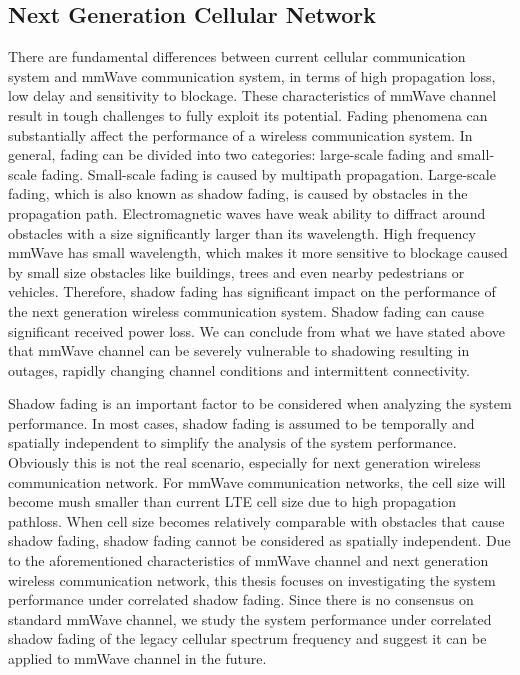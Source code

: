 \subsection{Next Generation Cellular Network}
\par There are fundamental differences between current cellular communication system and mmWave communication system, in terms of high propagation loss, low delay and sensitivity to blockage. These characteristics of mmWave channel result in tough challenges to fully exploit its potential. Fading phenomena can substantially affect the performance of a wireless communication system. In general, fading can be divided into two categories: large-scale fading and small-scale fading. Small-scale fading is caused by multipath propagation. Large-scale fading, which is also known as shadow fading, is caused by obstacles in the propagation path. Electromagnetic waves have weak ability to diffract around obstacles with a size significantly larger than its wavelength. High frequency mmWave has small wavelength, which makes it more sensitive to blockage caused by small size obstacles like buildings, trees and even nearby pedestrians or vehicles. Therefore, shadow fading has significant impact on the performance of the next generation wireless communication system. Shadow fading can cause significant received power loss. We can conclude from what we have stated above that mmWave channel can be severely vulnerable to shadowing resulting in outages, rapidly changing channel conditions and intermittent connectivity. 
\par Shadow fading is an important factor to be considered when analyzing the system performance. In most cases, shadow fading is assumed to be temporally and spatially independent to simplify the analysis of the system performance. Obviously this is not the real scenario, especially for next generation wireless communication network. For mmWave communication networks, the cell size will become mush smaller than current LTE cell size due to high propagation pathloss. When cell size becomes relatively comparable with obstacles that cause shadow fading, shadow fading cannot be considered as spatially independent. Due to the aforementioned characteristics of mmWave channel and next generation wireless communication network, this thesis focuses on investigating the system performance under correlated shadow fading. Since there is no consensus on standard mmWave channel, we study the system performance under correlated shadow fading of the legacy cellular spectrum frequency and suggest it can be applied to mmWave channel in the future. 
